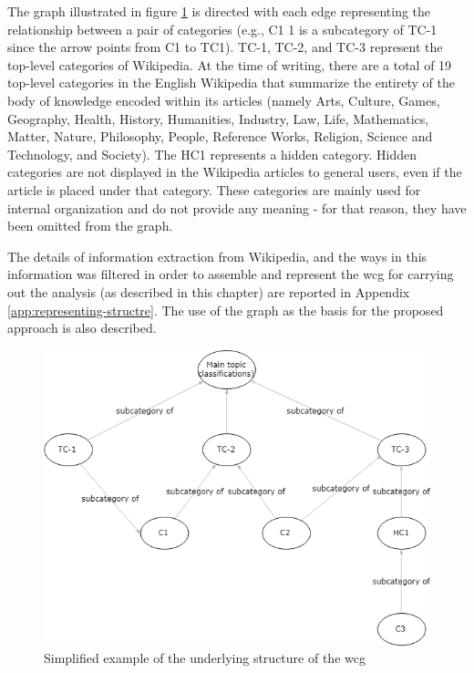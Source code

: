 The graph illustrated in figure \ref{fig:graph-example-wcg} is directed with each edge representing the relationship between a pair of categories (e.g., C1 1 is a subcategory of TC-1 since the arrow points from C1 to TC1). TC-1, TC-2, and TC-3 represent the top-level categories of Wikipedia. At the time of writing, there are a total of 19 top-level categories in the English Wikipedia that summarize the entirety of the body of knowledge encoded within its articles (namely Arts, Culture, Games, Geography, Health, History, Humanities, Industry, Law, Life, Mathematics, Matter, Nature, Philosophy, People, Reference Works, Religion, Science and Technology, and Society). The HC1 represents a hidden category. Hidden categories are not displayed in the Wikipedia articles to general users, even if the article is placed under that category. These categories are mainly used for internal organization and do not provide any meaning - for that reason, they have been omitted from the graph.

The details of information extraction from Wikipedia, and the ways in this information was filtered in order to assemble and represent the \gls{wcg} for carrying out the analysis (as described in this chapter) are reported in Appendix \ref{app:representing-structre}. The use of the graph as the basis for the proposed approach is also described.

\begin{figure}[H]
  \includegraphics[width=\linewidth]{imgs/wcg-example}
  \caption{Simplified example of the underlying structure of the \gls{wcg}}
  \label{fig:graph-example-wcg}
\end{figure}



